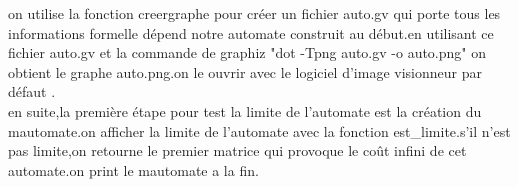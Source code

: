 \documentclass{report}
\begin{document}
on utilise la fonction creergraphe pour créer un fichier auto.gv qui porte tous les informations formelle dépend notre automate construit au début.en utilisant ce fichier auto.gv et la commande de graphiz "dot -Tpng auto.gv -o auto.png" on obtient le graphe auto.png.on le ouvrir avec le logiciel  d'image visionneur par défaut .\\

en suite,la première étape pour test la limite de l'automate est la création du mautomate.on afficher la limite de l'automate avec la fonction est\_limite.s'il n'est pas limite,on retourne le premier matrice qui provoque le coût infini de cet automate.on print le mautomate a la fin.\\




\end{document}
